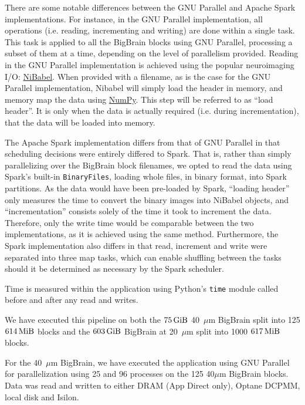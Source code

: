 \documentclass[conference]{IEEEtran}
\newcommand{\bigbrain}{BigBrain\xspace}
\begin{document}
There are some notable differences between the GNU Parallel and Apache Spark implementations.
For instance, in the GNU Parallel implementation, all operations (i.e. reading, incrementing and writing)
are done within a single task. This task is applied to all the \bigbrain blocks using GNU Parallel,
processing a subset of them at a time,
depending on the level of parallelism provided. Reading in the GNU Parallel implementation 
is achieved using the popular neuroimaging I/O: \href{https://nipy.org/nibabel/}{NiBabel}. When provided with a filename, as is the case
for the GNU Parallel implementation, Nibabel will simply load the header in memory, and memory map the data
using \href{https://numpy.org/}{NumPy}. This step will be referred to as ``load header''. It is only when the data is actually required
(i.e. during incrementation), that the data will be loaded into memory.

The Apache Spark implementation differs from that of GNU Parallel in that scheduling decisions
were entirely differed to Spark. That is, rather than simply parallelizing over the \bigbrain block filenames,
we opted to read the data using Spark's built-in
\texttt{BinaryFiles}, loading whole files, in binary format, into Spark partitions. As the
data would have been pre-loaded by Spark, ``loading header'' only measures the time to
convert the binary images into NiBabel objects, and ``incrementation'' consists solely
of the time it took to increment the data. Therefore, only the write time would be
comparable between the two implementations, as it is achieved using the same method.
Furthermore, the Spark implementation also differs in that read, increment and write
were separated into three map tasks, which can enable shuffling between the tasks should 
it be determined as necessary by the Spark scheduler.

Time is measured within the application using Python's \texttt{time} module 
called before and after any read and writes.

We have executed this pipeline on both the $\SI{75}{\gibi\byte}$ 40~$\mu$m 
\bigbrain split into 125 $\SI{614}{\mebi\byte}$ blocks and the $\SI{603}{\gibi\byte}$
\bigbrain at 20~$\mu$m split into 1000 $\SI{617}{\mebi\byte}$ blocks.

For the 40~$\mu$m \bigbrain, we have executed the application using GNU Parallel for parallelization
using 25 and 96 processes on the 125 40$\mu$m \bigbrain blocks. Data was read and written to either
DRAM (App Direct only), Optane DCPMM, local disk and Isilon. 
\end{document}
